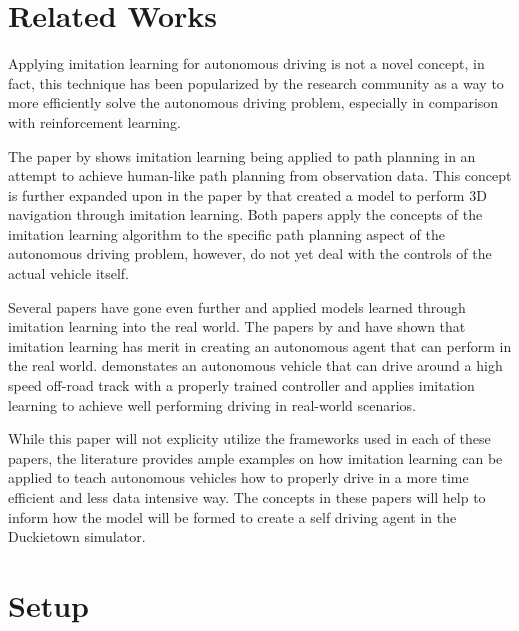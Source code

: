 \documentclass[conference]{IEEEtran}
\begin{document}
\section{Related Works}
Applying imitation learning for autonomous driving is not a novel concept, in fact, this technique
has been popularized by the research community as a way to more efficiently solve the 
autonomous driving problem, especially in comparison with reinforcement learning. \par
The paper by \citet{humanDriving} shows imitation learning being applied to path planning in an 
attempt to achieve human-like path planning from observation data. This concept is further expanded
upon in the paper by \citet{deepImitation} that created a model to perform 3D navigation through imitation
learning. Both papers apply the concepts of the imitation learning algorithm to the specific path planning 
aspect of the autonomous driving problem, however, do not yet deal with the controls of the actual 
vehicle itself. \par
Several papers have gone even further and applied models learned through imitation learning into the real 
world. The papers by \citet{agile} and \citet{waymo} have shown that imitation learning has 
merit in creating an autonomous agent that can perform in the real world. \citet{agile} demonstates
an autonomous vehicle that can drive around a high speed off-road track with a properly trained 
controller and \citet{waymo} applies imitation learning to achieve well performing driving in 
real-world scenarios. \par 
While this paper will not explicity utilize the frameworks used in each of these papers, the 
literature provides ample examples on how imitation learning can be applied to teach autonomous vehicles
how to properly drive in a more time efficient and less data intensive way. The concepts in
these papers will help to inform how the model will be formed to create a self driving agent in the 
Duckietown simulator.

\section{Setup}
\end{document}
